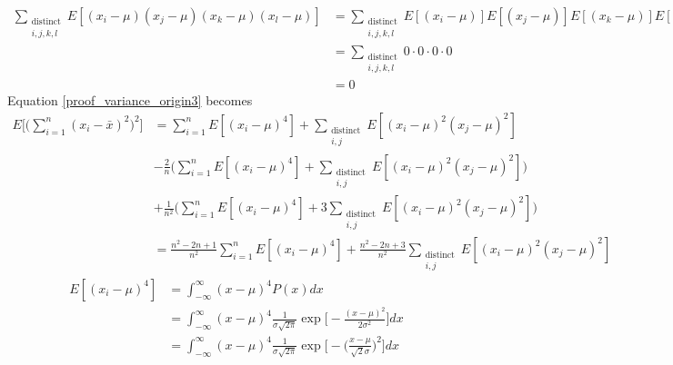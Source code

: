 \documentclass[12pt,a4paper]{report}
\begin{document}
\begin{align*}
\sum_{\substack{\text{distinct} \\ i,j,k,l}} E[(x_i - \mu)(x_j - \mu)(x_k - \mu)(x_l - \mu)]
&= \sum_{\substack{\text{distinct} \\ i,j,k,l}} E[(x_i - \mu)] E[(x_j - \mu)] E[(x_k - \mu)] E[(x_l - \mu)] \\
&= \sum_{\substack{\text{distinct} \\ i,j,k,l}} 0 \cdot 0 \cdot 0 \cdot 0 \\
&= 0
\end{align*}
Equation \ref{proof_variance_origin3} becomes
\begin{align*}
E \Bigg[ \Bigg( \sum_{i = 1}^{n} (x_i - \bar{x})^2 \Bigg)^2 \Bigg]
&= \sum_{i = 1}^{n} E[(x_i - \mu)^4] + \sum_{\substack{\text{distinct} \\ i,j}} E[(x_i - \mu)^2 (x_j - \mu)^2] \\
&- \frac{2}{n} \Bigg( \sum_{i=1}^n E[(x_i - \mu)^4] + \sum_{\substack{\text{distinct} \\ i,j}} E[(x_i - \mu)^2(x_j - \mu)^2] \Bigg) \\
&+ \frac{1}{n^2} \Bigg( \sum_{i=1}^n E[(x_i - \mu)^4] + 3 \sum_{\substack{\text{distinct} \\ i,j}} E[(x_i - \mu)^2 (x_j - \mu)^2] \Bigg) \\
&= \frac{n^2-2n+1}{n^2} \sum_{i = 1}^{n} E[(x_i - \mu)^4] + \frac{n^2-2n+3}{n^2} \sum_{\substack{\text{distinct} \\ i,j}} E[(x_i - \mu)^2 (x_j - \mu)^2]
\end{align*}
\begin{align*}
E[(x_i - \mu)^4]
&= \int_{-\infty}^{\infty} (x - \mu)^4 P(x) dx \\
&= \int_{-\infty}^{\infty} (x - \mu)^4 \frac{1}{\sigma \sqrt{2\pi}} \exp \Bigg[ - \frac{(x-\mu)^2}{2\sigma^2} \Bigg] dx \\
&= \int_{-\infty}^{\infty} (x - \mu)^4 \frac{1}{\sigma \sqrt{2\pi}} \exp \Bigg[ - \Bigg( \frac{x-\mu}{\sqrt{2}\sigma} \Bigg)^2 \Bigg] dx
\end{align*}
\end{document}
